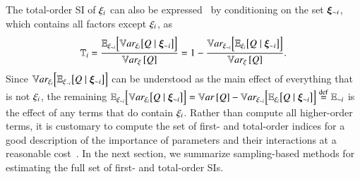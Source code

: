 The total-order SI of $\xii$ can also be expressed~\cite{homma-saltelli-1996, saltelli-2002} by conditioning on the set $\bxi_\ni$, which contains all factors except $\xii$, as
\begin{equation} \label{m2eq:ti}
    \T{i} = \frac{\EVni{Q \mid \bxi_\ni}}{\Vxi{Q}} = 1 - \frac{\VEni{Q \mid \bxi_\ni}}{\Vxi{Q}} .
\end{equation}
Since $\VEi{Q \mid \bxi_{\sim i}}$ can be understood as the main effect of everything that is not $\xii$, the remaining $\EVni{Q \mid \bxi_{\sim i}} = \Var{Q} - \VEni{Q \mid \bxi_{\sim i}} \defin \E{\ni}$ is the effect of any terms that do contain $\xii$. 
Rather than compute all higher-order terms, it is customary to compute the set of first- and total-order indices for a good description of the importance of parameters and their interactions at a reasonable cost~\cite{saltelli-etal-2008}.
In the next section, we summarize sampling-based methods for estimating the full set of first- and total-order SIs. 